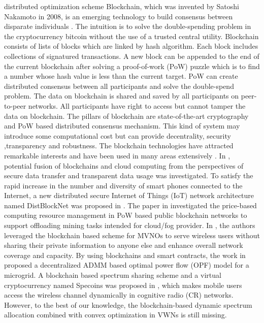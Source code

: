 \documentclass[journal]{IEEEtran}
\begin{document}
\begin{IEEEkeywords}
distributed optimization scheme 
Blockchain, which was invented by Satoshi Nakamoto in 2008, is an emerging technology to build consensus between disparate individuals \cite{SNakamoto}. The intuition is to solve the double-spending problem in the cryptocurrency bitcoin without the use of a trusted central utility. Blockchain consists of lists of blocks which are linked by hash algorithm. Each block includes collections of signatured transactions. A new block can be appended to the end of the current blockchain after solving a proof-of-work (PoW) puzzle which is to find a number whose hash value is less than the current target. PoW can create distributed consensus between all participants and solve the double-spend problem. The data on blockchain is shared and saved by all participants on peer-to-peer networks. All participants have right to access but cannot tamper the data on blockchain. The pillars of blockchain are state-of-the-art cryptography and PoW based distributed consensus mechanism. This kind of system may introduce some computational cost but can provide decentrality, security ,transparency and robustness. The blockchain technologies have attracted remarkable interests and have been used in many areas extensively \cite{KGai,PKSharma,ZXiong,DBRawat,E. Münsing,KKotobi}. In \cite{KGai}, potential fusion of blockchains and cloud computing from the perspectives of secure data transfer and transparent data usage was investigated. To satisfy the rapid increase in the number and diversity
of smart phones connected to the Internet, a new distributed secure Internet of Things (IoT) network architecture named DistBlockNet was proposed in \cite{PKSharma}. The paper in \cite{ZXiong} investigated the price-based computing resource management in PoW based public blockchain networks to support offloading mining tasks intended for cloud/fog provider. In \cite{DBRawat}, the authors leveraged the blockchain based scheme for MVNOs to serve wireless users without sharing their
private information to anyone else
and enhance overall network coverage and capacity. By using blockchains and smart contracts, the work in \cite{E. Münsing} proposed a decentralized ADMM based optimal power flow (OPF) model for a microgrid. A blockchain based spectrum sharing scheme and a virtual cryptocurrency named Specoins was proposed in \cite{KKotobi}, which makes mobile users access the wireless channel dynamically in cognitive radio (CR) networks. However, to the best of our knowledge, the blockchain-based dynamic spectrum allocation combined with convex optimization in VWNs is still missing.


\end{IEEEkeywords}
\end{document}
